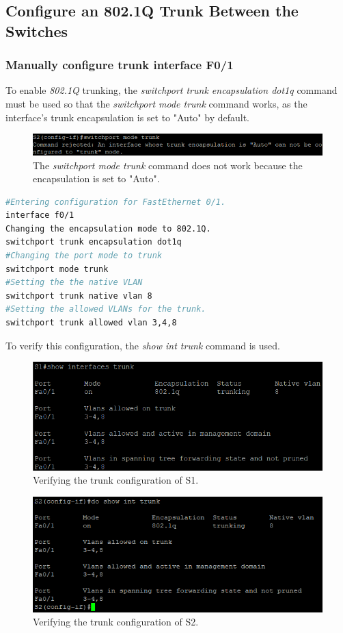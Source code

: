 \documentclass[a4paper]{article}
\newcommand{\ii}{\textit}
\begin{document}
\subsection{Configure an 802.1Q Trunk Between the Switches}

\subsubsection{Manually configure trunk interface F0/1}
To enable \ii{802.1Q} trunking, the \ii{switchport trunk encapsulation dot1q} command must be used so that the \ii{switchport mode trunk} command works, as the interface's trunk encapsulation is set to "Auto" by default.

\begin{figure}[h]
	\includegraphics[scale=0.55]{images/upsi.png}
	\centering
	\caption{The \ii{switchport mode trunk} command does not work because the encapsulation is set to "Auto".}
\end{figure}
\begin{lstlisting}[language=bash]
#Entering configuration for FastEthernet 0/1.
interface f0/1	
Changing the encapsulation mode to 802.1Q.
switchport trunk encapsulation dot1q
#Changing the port mode to trunk
switchport mode trunk
#Setting the the native VLAN
switchport trunk native vlan 8
#Setting the allowed VLANs for the trunk.
switchport trunk allowed vlan 3,4,8
\end{lstlisting}
To verify this configuration, the \ii{show int trunk} command is used.
\begin{figure}[h]
	\includegraphics[scale=0.55]{images/s1_show_trunk.png}
	\centering
	\caption{Verifying the trunk configuration of S1.}
\end{figure}
\begin{figure}[h]
	\includegraphics[scale=0.55]{images/s2_show_trunk.png}
	\centering
	\caption{Verifying the trunk configuration of S2.}
\end{figure}
\newpage
\end{document}
